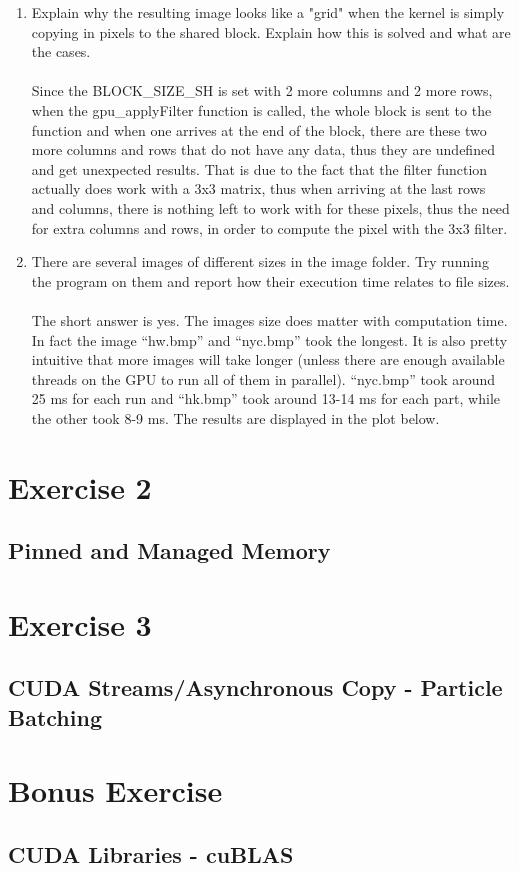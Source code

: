 \documentclass[english]{exam}
\begin{document}
\begin{enumerate}
\item Explain why the resulting image looks like a "grid" when the kernel is simply copying in pixels to the shared block. Explain how this is solved and what are the cases.\\\\
  Since the BLOCK\_SIZE\_SH is set with 2 more columns and 2 more rows, when the gpu\_applyFilter function is called, the whole block is sent to the function and when one arrives at the end of the block, there are these two more columns and rows that do not have any data, thus they are undefined and get unexpected results. That is due to the fact that the filter function actually does work with a 3x3 matrix, thus when arriving at the last rows and columns, there is nothing left to work with for these pixels, thus the need for extra columns and rows, in order to compute the pixel with the 3x3 filter.
  
\item There are several images of different sizes in the image folder. Try running the program on them and report how their execution time relates to file sizes.\\\\
  The short answer is yes. The images size does matter with computation time. In fact the image ``hw.bmp'' and ``nyc.bmp'' took the longest. It is also pretty intuitive that more images will take longer (unless there are enough available threads on the GPU to run all of them in parallel). ``nyc.bmp'' took around 25 ms for each run and ``hk.bmp'' took around 13-14 ms for each part, while the other took 8-9 ms. The results are displayed in the plot below.

\end{enumerate}

\clearpage
\chapter{Exercise 2}
\section*{Pinned and Managed Memory}

\clearpage
\chapter{Exercise 3}
\section*{CUDA Streams/Asynchronous Copy - Particle Batching}

\clearpage
\chapter{Bonus Exercise}
\section*{CUDA Libraries - cuBLAS}


\renewcommand{\bibname}{References}

\end{document}
